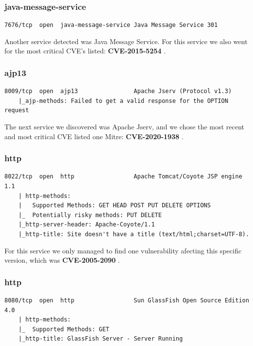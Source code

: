 \subsubsection{java-message-service}

\begin{lstlisting}[basicstyle=\scriptsize]
    7676/tcp  open  java-message-service Java Message Service 301
\end{lstlisting}

Another service detected was Java Message Service. For this service we also went for the most critical CVE's listed: \textbf{CVE-2015-5254} \cite{cve8}.

\subsubsection{ajp13}

\begin{lstlisting}[basicstyle=\scriptsize]
    8009/tcp  open  ajp13                Apache Jserv (Protocol v1.3)
    |_ajp-methods: Failed to get a valid response for the OPTION request
\end{lstlisting}

The next service we discovered was Apache Jserv, and we chose the most recent and most critical CVE listed one Mitre: \textbf{CVE-2020-1938} \cite{cve9}.

\subsubsection{http}

\begin{lstlisting}[basicstyle=\scriptsize]
    8022/tcp  open  http                 Apache Tomcat/Coyote JSP engine 1.1
    | http-methods: 
    |   Supported Methods: GET HEAD POST PUT DELETE OPTIONS
    |_  Potentially risky methods: PUT DELETE
    |_http-server-header: Apache-Coyote/1.1
    |_http-title: Site doesn't have a title (text/html;charset=UTF-8).
\end{lstlisting}

For this service we only managed to find one vulnerability afecting this specific version, which was \textbf{CVE-2005-2090} \cite{cve10}.

\subsubsection{http}

\begin{lstlisting}[basicstyle=\scriptsize]
    8080/tcp  open  http                 Sun GlassFish Open Source Edition  4.0
    | http-methods: 
    |_  Supported Methods: GET
    |_http-title: GlassFish Server - Server Running
\end{lstlisting}

